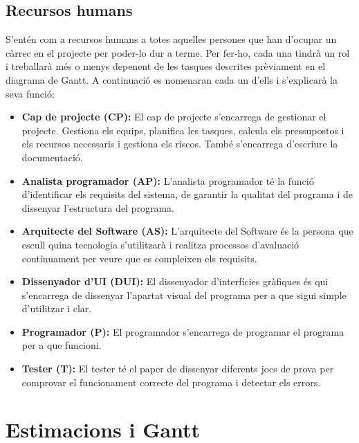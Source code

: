 \documentclass[a4paper]{article}
\begin{document}
\newpage
\subsection{Recursos humans}
S'entén com a recursos humans a totes aquelles persones que han d'ocupar un càrrec en el projecte per poder-lo dur a terme. Per fer-ho, cada una tindrà un rol i treballarà més o menys depenent de les tasques descrites prèviament en el diagrama de Gantt. A continuació es nomenaran cada un d'ells i s'explicarà la seva funció:
\begin{itemize}
    \item \textbf{Cap de projecte (CP):} El cap de projecte s'encarrega de gestionar el projecte. Gestiona els equips, planifica les tasques, calcula els pressupostos i els recursos necessaris i gestiona els riscos. També s'encarrega d'escriure la documentació.
    
    \item \textbf{Analista programador (AP):} L'analista programador té la funció d'identificar els requisits del sistema, de garantir la qualitat del programa i de dissenyar l'estructura del programa.
    
    \item \textbf{Arquitecte del Software (AS):} L'arquitecte del Software és la persona que escull quina tecnologia s'utilitzarà i realitza processos d'avaluació contínuament per veure que es compleixen els requisits.
    
    \item \textbf{Dissenyador d'UI (DUI):} El dissenyador d'interfícies gràfiques és qui s'encarrega de dissenyar l'apartat visual del programa per a que sigui simple d'utilitzar i clar. 
    
    \item \textbf{Programador (P):} El programador s'encarrega de programar el programa per a que funcioni.
    
    \item \textbf{Tester (T):} El tester té el paper de dissenyar diferents jocs de prova per comprovar el funcionament correcte del programa i detectar els errors.
\end{itemize}

\newpage
\section{Estimacions i Gantt}
\end{document}
